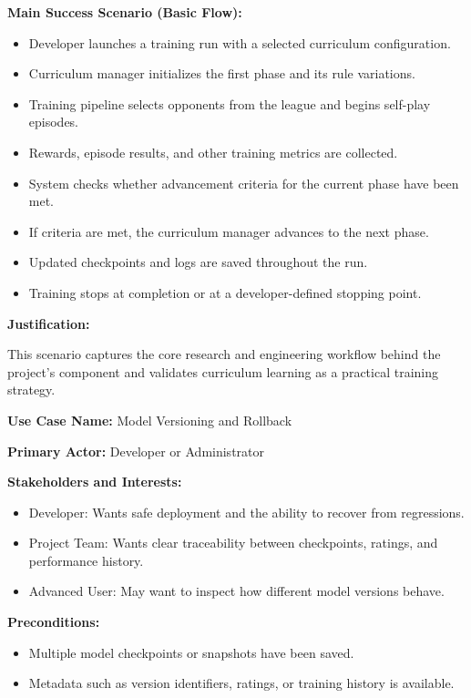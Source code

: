 \documentclass{article}
\begin{document}
\noindent\textbf{Main Success Scenario (Basic Flow):}
\begin{itemize}
    \item Developer launches a training run with a selected curriculum configuration.
    \item Curriculum manager initializes the first phase and its rule variations.
    \item Training pipeline selects opponents from the league and begins self-play episodes.
    \item Rewards, episode results, and other training metrics are collected.
    \item System checks whether advancement criteria for the current phase have been met.
    \item If criteria are met, the curriculum manager advances to the next phase.
    \item Updated checkpoints and logs are saved throughout the run.
    \item Training stops at completion or at a developer-defined stopping point.
\end{itemize}

\noindent\textbf{Justification:}

This scenario captures the core research and engineering workflow behind the project's \RL{} component and validates curriculum learning as a practical training strategy.

\vspace{1em}

\noindent\textbf{Use Case Name:} Model Versioning and Rollback

\noindent\textbf{Primary Actor:} Developer or Administrator

\noindent\textbf{Stakeholders and Interests:}
\begin{itemize}
    \item Developer: Wants safe deployment and the ability to recover from regressions.
    \item Project Team: Wants clear traceability between checkpoints, ratings, and performance history.
    \item Advanced User: May want to inspect how different model versions behave.
\end{itemize}

\noindent\textbf{Preconditions:}
\begin{itemize}
    \item Multiple model checkpoints or snapshots have been saved.
    \item Metadata such as version identifiers, ratings, or training history is available.
\end{itemize}
\end{document}
